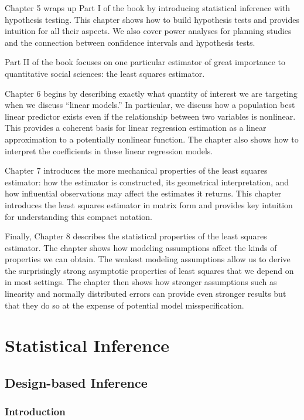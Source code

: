 \documentclass[
  letterpaper,
  DIV=11,
  numbers=noendperiod]{scrreprt}
\theoremstyle{plain}
\theoremstyle{definition}
\theoremstyle{definition}
\theoremstyle{remark}
\begin{document}
Chapter 5 wraps up Part I of the book by introducing statistical
inference with hypothesis testing. This chapter shows how to build
hypothesis tests and provides intuition for all their aspects. We also
cover power analyses for planning studies and the connection between
confidence intervals and hypothesis tests.

Part II of the book focuses on one particular estimator of great
importance to quantitative social sciences: the least squares estimator.

Chapter 6 begins by describing exactly what quantity of interest we are
targeting when we discuss ``linear models.'' In particular, we discuss
how a population best linear predictor exists even if the relationship
between two variables is nonlinear. This provides a coherent basis for
linear regression estimation as a linear approximation to a potentially
nonlinear function. The chapter also shows how to interpret the
coefficients in these linear regression models.

Chapter 7 introduces the more mechanical properties of the least squares
estimator: how the estimator is constructed, its geometrical
interpretation, and how influential observations may affect the
estimates it returns. This chapter introduces the least squares
estimator in matrix form and provides key intuition for understanding
this compact notation.

Finally, Chapter 8 describes the statistical properties of the least
squares estimator. The chapter shows how modeling assumptions affect the
kinds of properties we can obtain. The weakest modeling assumptions
allow us to derive the surprisingly strong asymptotic properties of
least squares that we depend on in most settings. The chapter then shows
how stronger assumptions such as linearity and normally distributed
errors can provide even stronger results but that they do so at the
expense of potential model misspecification.

\part{Statistical Inference}

\hypertarget{sec-design-based}{%
\chapter{Design-based Inference}\label{sec-design-based}}

\hypertarget{introduction-1}{%
\section{Introduction}\label{introduction-1}}
\end{document}
